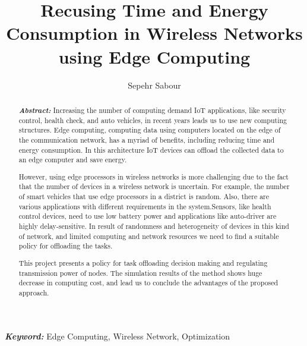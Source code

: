 \documentclass[12pt,final,3p]{CSP}
\begin{document}
\begin{frontmatter}
\setcounter{page}{1}
\title{Recusing Time and Energy Consumption in Wireless Networks using Edge Computing}

\author[mymainaddress]{Sepehr Sabour}

\address[mymainaddress]{sepehr.sabour@ucalgary.ca}
\nocite{*}
\begin{abstract}\rm
\begin{adjustwidth}{2cm}{2cm}{\itshape\textbf{Abstract:}} 
Increasing the number of computing demand IoT applications, like security control, health check, and auto vehicles, in recent years leads us to use new computing structures. Edge computing, computing data using computers located on the edge of the communication network, has a myriad of benefits, including reducing time and energy consumption. In this architecture IoT devices can offload the collected data to an edge computer and save energy.

However, using edge processors in wireless networks is more challenging due to the fact that the number of devices in a wireless network is uncertain. For example, the number of smart vehicles that use edge processors in a district is random. Also, there are various applications with different requirements in the system.Sensors, like health control devices, need to use low battery power and applications like auto-driver are highly delay-sensitive. In result of randomness and heterogeneity of devices in this kind of network, and limited computing and network resources we need to find a suitable policy for offloading the tasks.

This project presents a policy for task offloading decision making and regulating transmission power of nodes. The simulation results of the method shows huge decrease in computing cost, and lead us to conclude the advantages of the proposed approach.

\end{adjustwidth}
\end{abstract}


\begin{keyword}\rm
\begin{adjustwidth}{2cm}{2cm}{\itshape\textbf{Keyword:}}  
Edge Computing, Wireless Network, Optimization 
\end{adjustwidth}
\end{keyword}

\end{frontmatter}
\end{document}
